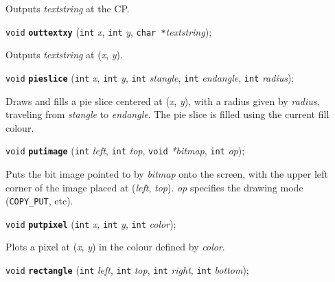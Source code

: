 \documentclass[a4paper,12pt]{article}
\newcommand{\V}{\texttt{void}}      %
\newcommand{\I}{\texttt{int}}       %
\newcommand{\C}{\texttt{char *}}    %
\newcommand{\func}[1]{\textbf{\texttt{#1}}}  %
\newcommand{\A}[1]{\emph{#1}}       %
\newcommand{\T}[1]{\texttt{#1}}     %
\newenvironment{bgi}
{ %
  \begin{snugshade}
}
{ %
  \end{snugshade}
}
\begin{document}
Outputs \A{textstring} at the CP.


\label{sec:outtextxy}

\begin{bgi}
\V{} \func{outtextxy} (\I{} \A{x}, \I{} \A{y}, \C{}\A{textstring});
\end{bgi}

Outputs \A{textstring} at (\A{x}, \A{y}).


\label{sec:pieslice}

\begin{bgi}
\V{} \func{pieslice} (\I{} \A{x}, \I{} \A{y}, \I{} \A{stangle}, \I{}
\A{endangle}, \I{} \A{radius});
\end{bgi}

Draws and fills a pie slice centered at (\A{x}, \A{y}), with a radius
given by \A{radius}, traveling from \A{stangle} to \A{endangle}. The
pie slice is filled using the current fill colour.


\label{sec:putimage}

\begin{bgi}
\V{} \func{putimage} (\I{} \A{left}, \I{} \A{top}, \V{} \A{*bitmap},
\I{} \A{op});
\end{bgi}

Puts the bit image pointed to by \A{bitmap} onto the screen, with the
upper left corner of the image placed at (\A{left}, \A{top}). \A{op}
specifies the drawing mode (\T{COPY\_PUT}, etc).


\label{sec:putpixel}

\begin{bgi}
\V{} \func{putpixel} (\I{} \A{x}, \I{} \A{y}, \I{} \A{color});
\end{bgi}

Plots a pixel at (\A{x}, \A{y}) in the colour defined by \A{color}.


\label{sec:rectangle}

\begin{bgi}
\V{} \func{rectangle} (\I{} \A{left}, \I{} \A{top}, \I{} \A{right},
\I{} \A{bottom});
\end{bgi}
\end{document}
